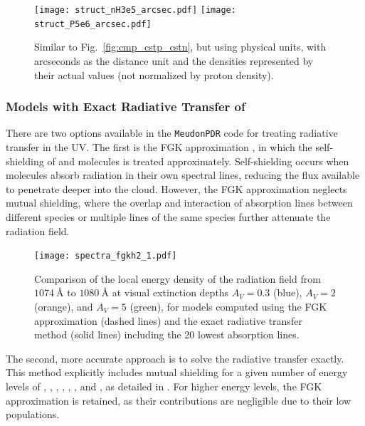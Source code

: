 \documentclass[12pt,a4paper]{article}
\newcommand{\mdpdr}{\texttt{MeudonPDR} code}
\begin{document}
\begin{figure}[hb]
    \centering
    \texttt{[image: struct\_nH3e5\_arcsec.pdf]}
    \texttt{[image: struct\_P5e6\_arcsec.pdf]}
    \caption{Similar to Fig.~\ref{fig:cmp_cstp_cstn}, but using physical units, with arcseconds as the distance unit and the densities represented by their actual values (not normalized by proton density).} \label{fig:cmp_cstp_cstn_arcsec}
\end{figure}

\subsubsection{Models with Exact Radiative Transfer of \texorpdfstring{}{H2}} \label{sec:exactrt}

There are two options available in the \mdpdr{} for treating radiative transfer in the UV. The first is the FGK approximation \parencite{Federman1979}, in which the self-shielding of  and  molecules is treated approximately. Self-shielding occurs when molecules absorb radiation in their own spectral lines, reducing the flux available to penetrate deeper into the cloud. However, the FGK approximation neglects mutual shielding, where the overlap and interaction of absorption lines between different species or multiple lines of the same species further attenuate the radiation field.

\begin{figure}[ht]
    \centering
    \texttt{[image: spectra\_fgkh2\_1.pdf]}
    \caption{Comparison of the local energy density of the radiation field from $1074~\text{\AA}$ to $1080~\text{\AA}$ at visual extinction depths $A_V = 0.3$ (blue), $A_V = 2$ (orange), and $A_V = 5$ (green), for models computed using the FGK approximation (dashed lines) and the exact radiative transfer method (solid lines) including the 20 lowest  absorption lines.} \label{fig:cmpH2rtspectra}
\end{figure}

The second, more accurate approach is to solve the radiative transfer exactly. This method explicitly includes mutual shielding for a given number of energy levels of , , , , , , and , as detailed in \textcite{Goicoechea2007,Gonzalez2008}. For higher energy levels, the FGK approximation is retained, as their contributions are negligible due to their low populations.
\end{document}
